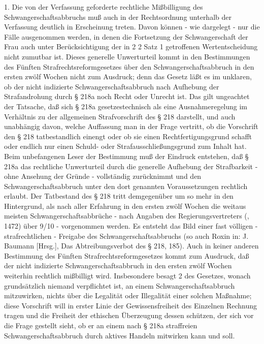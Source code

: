 \documentclass[12pt]{article}
\begin{document}
\syncleft
\begin{sourcepara}
1. Die von der Verfassung geforderte rechtliche Mißbilligung des Schwangerschaftsabbruchs muß auch in der Rechtsordnung unterhalb der Verfassung deutlich in Erscheinung treten. Davon können - wie dargelegt - nur die Fälle ausgenommen werden, in denen die Fortsetzung der Schwangerschaft der Frau auch unter Berücksichtigung der in \abbrArt{} 2 \abbrAbs{} 2 Satz 1 \abbrGG{}\ggfnArtTwoTwoOneDE{} getroffenen Wertentscheidung nicht zumutbar ist. Dieses generelle Unwerturteil kommt in den Bestimmungen des Fünften Strafrechtsreformgesetzes über den Schwangerschaftsabbruch in den ersten zwölf Wochen nicht zum Ausdruck; denn das Gesetz läßt es im unklaren, ob der nicht indizierte Schwangerschaftsabbruch nach Aufhebung der Strafandrohung durch § 218a \abbrStGB{} noch Recht oder Unrecht ist. Das gilt ungeachtet der Tatsache, daß sich § 218a \abbrStGB{} gesetzestechnisch als eine Ausnahmeregelung im Verhältnis zu der allgemeinen Strafvorschrift des § 218 \abbrStGB{} darstellt, und auch unabhängig davon, welche Auffassung man in der Frage vertritt, ob die Vorschrift den § 218 \abbrStGB{} tatbestandlich einengt oder ob sie einen Rechtfertigungsgrund schafft oder endlich nur einen Schuld- oder Strafausschließungsgrund zum Inhalt hat. Beim unbefangenen Leser der Bestimmung muß der Eindruck entstehen, daß § 218a das rechtliche Unwerturteil durch die generelle Aufhebung der Strafbarkeit - ohne Ansehung der Gründe - vollständig zurücknimmt und den Schwangerschaftsabbruch unter den dort genannten Voraussetzungen rechtlich erlaubt. Der Tatbestand des § 218 \abbrStGB{} tritt demgegenüber um so mehr in den Hintergrund, als nach aller Erfahrung in den ersten zwölf Wochen die weitaus meisten Schwangerschaftsabbrüche - nach Angaben des Regierungsvertreters (\abbrAAO{}, \abbrS{} 1472) über 9/10 - vorgenommen werden. Es entsteht das Bild einer fast völligen - strafrechtlichen - Freigabe des Schwangerschaftsabbruchs (so auch Roxin in: J. Baumann [Hrsg.], Das Abtreibungsverbot des § 218, \abbrS{} 185). Auch in keiner anderen Bestimmung des Fünften Strafrechtsreformgesetzes kommt zum Ausdruck, daß der nicht indizierte Schwangerschaftsabbruch in den ersten zwölf Wochen weiterhin rechtlich mißbilligt wird. Insbesondere besagt \abbrArt{} 2 des Gesetzes, wonach grundsätzlich niemand verpflichtet ist, an einem Schwangerschaftsabbruch mitzuwirken, nichts über die Legalität oder Illegalität einer solchen Maßnahme; diese Vorschrift will in erster Linie der Gewissensfreiheit des Einzelnen Rechnung tragen und die Freiheit der ethischen Überzeugung dessen schützen, der sich vor die Frage gestellt sieht, ob er an einem nach § 218a \abbrStGB{} straffreien Schwangerschaftsabbruch durch aktives Handeln mitwirken kann und soll.
\end{sourcepara}
\end{document}
